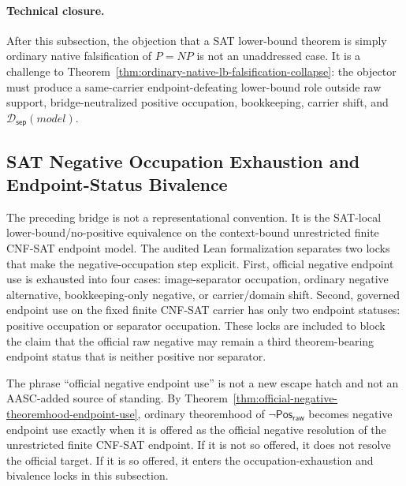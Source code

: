 \documentclass[11pt]{article}
\theoremstyle{definition}
\theoremstyle{remark}
\newcommand{\PosRaw}{\mathsf{Pos}_{\mathsf{raw}}}
\newcommand{\SepDisc}{\mathcal{D}_{\mathsf{sep}}}
\begin{document}
\paragraph{Technical closure.}
After this subsection, the objection that a SAT lower-bound theorem is simply ordinary native falsification of \(P=NP\) is not an unaddressed case. It is a challenge to Theorem~\ref{thm:ordinary-native-lb-falsification-collapse}: the objector must produce a same-carrier endpoint-defeating lower-bound role outside raw support, bridge-neutralized positive occupation, bookkeeping, carrier shift, and \(\SepDisc(model)\).


\subsection{SAT Negative Occupation Exhaustion and Endpoint-Status Bivalence}\label{subsec:sat-negative-occupation-bivalence}

The preceding bridge is not a representational convention. It is the SAT-local lower-bound/no-positive equivalence on the context-bound unrestricted finite CNF-SAT endpoint model. The audited Lean formalization separates two locks that make the negative-occupation step explicit. First, official negative endpoint use is exhausted into four cases: image-separator occupation, ordinary negative alternative, bookkeeping-only negative, or carrier/domain shift. Second, governed endpoint use on the fixed finite CNF-SAT carrier has only two endpoint statuses: positive occupation or separator occupation. These locks are included to block the claim that the official raw negative may remain a third theorem-bearing endpoint status that is neither positive nor separator.

The phrase ``official negative endpoint use'' is not a new escape hatch and not an AASC-added source of standing. By Theorem~\ref{thm:official-negative-theoremhood-endpoint-use}, ordinary theoremhood of \(\neg\PosRaw\) becomes negative endpoint use exactly when it is offered as the official negative resolution of the unrestricted finite CNF-SAT endpoint. If it is not so offered, it does not resolve the official target. If it is so offered, it enters the occupation-exhaustion and bivalence locks in this subsection.
\end{document}
